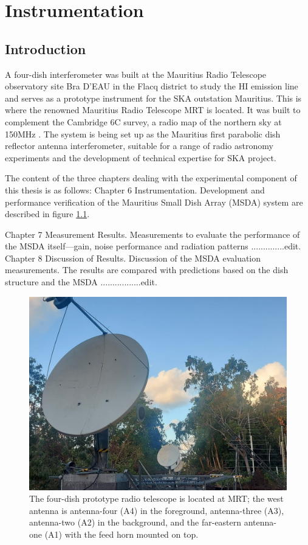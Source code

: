 
\chapter{Instrumentation}

\label{Chapter4}


\large{


\section*{Introduction}


A four-dish interferometer was built at the Mauritius Radio Telescope observatory site Bra D'EAU in the Flacq district to study the HI emission line and serves as a prototype instrument for the SKA outstation Mauritius. This is where the renowned Mauritius Radio Telescope MRT is located. It was built to complement the Cambridge 6C survey, a radio map of the northern sky at 150MHz \cite{somanah2013astrophysical}. The system is being set up as the Mauritius first parabolic dish reflector antenna interferometer, suitable for a range of radio astronomy experiments and the development of technical expertise for SKA project.

The content of the three chapters dealing with the experimental component of this thesis is as follows:
Chapter 6 Instrumentation. Development and performance verification of the Mauritius Small Dish Array (MSDA) system are described in figure \ref{fig:4.1}.

Chapter 7 Measurement Results. Measurements to evaluate the performance of the MSDA itself—gain, noise performance and radiation patterns ..............edit.
Chapter 8 Discussion of Results. Discussion of the MSDA evaluation measurements. The results are compared with predictions based on the dish structure and the MSDA .................edit.

\begin{figure}[h!]
    \centering
\includegraphics[width=6in]{Figures/MSDA1.jpg}
\caption{The four-dish prototype radio telescope is located at MRT; the west antenna is antenna-four (A4) in the foreground, antenna-three (A3), antenna-two (A2) in the background, and the far-eastern antenna-one (A1) with the feed horn mounted on top.}
 \label{fig:4.1}
\end{figure}




}
